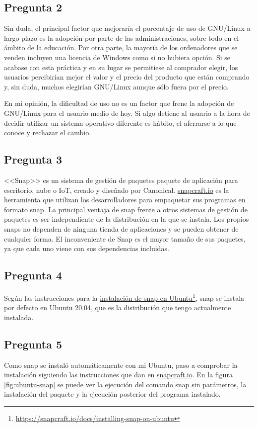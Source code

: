 \subsection{Pregunta 2}
Sin duda, el principal factor que mejoraría el porcentaje de uso de GNU/Linux a largo plazo es la adopción por parte de las administraciones, sobre todo en el ámbito de la educación. Por otra parte, la mayoría de los ordenadores que se venden incluyen una licencia de Windows como si no hubiera opción. Si se acabase con esta práctica y en su lugar se permitiese al comprador elegir, los usuarios percibirían mejor el valor y el precio del producto que están comprando y, sin duda, muchos elegirían GNU/Linux aunque sólo fuera por el precio.

En mi opinión, la dificultad de uso no es un factor que frene la adopción de GNU/Linux para el usuario medio de hoy. Si algo detiene al usuario a la hora de decidir utilizar un sistema operativo diferente es hábito, el aferrarse a lo que conoce y rechazar el cambio.

\subsection{Pregunta 3}
<<Snap>> es un sistema de gestión de paquetes paquete de aplicación para escritorio, nube o IoT, creado y diseñado por Canonical. \href{http://snapcraft.io}{snapcraft.io} es la herramienta que utilizan los desarrolladores para empaquetar sus programas en formato snap.
La principal ventaja de snap frente a otros sistemas de gestión de paquetes es ser independiente de la distribución en la que se instala. Los propios snaps no dependen de ninguna tienda de aplicaciones y se pueden obtener de cualquier forma. El inconveniente de Snap es el mayor tamaño de sus paquetes, ya que cada uno viene con sus dependencias incluidas.

\subsection{Pregunta 4}
Según las instrucciones para la \href{https://snapcraft.io/docs/installing-snap-on-ubuntu}{instalación de snap en Ubuntu}\footnote{\label{nota1}\url{https://snapcraft.io/docs/installing-snap-on-ubuntu}}, snap se instala por defecto en Ubuntu 20.04, que es la distribución que tengo actualmente instalada.

\subsection{Pregunta 5}
Como snap se instaló automáticamente con mi Ubuntu, paso a comprobar la instalación siguiendo las instrucciones que dan en \href{https://snapcraft.io/docs/installing-snap-on-ubuntu}{snapcraft.io}\footnotemark[1]. En la figura \ref{fig:ubuntu-snap} se puede ver la ejecución del comando snap sin parámetros, la instalación del paquete  y la ejecución posterior del programa instalado.

